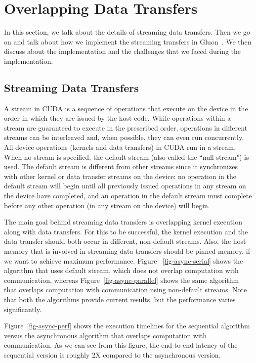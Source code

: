 \section{Overlapping Data Transfers}
\label{sec-async}

In this section, we talk about the details of streaming data transfers. Then we go on and talk about how we implement the streaming transfers in Gluon~\cite{dathathri2018gluon}. We then discuss about the implementation and the challenges that we faced during the implementation. 

\subsection{Streaming Data Transfers}

A stream in CUDA is a sequence of operations that execute on the device in the order in which they are issued by the host code. While operations within a stream are guaranteed to execute in the prescribed order, operations in different streams can be interleaved and, when possible, they can even run concurrently. All device operations (kernels and data transfers) in CUDA run in a stream. When no stream is specified, the default stream (also called the ``null stream") is used. The default stream is different from other streams since it synchronizes with 
other kernel or data transfer streams on the device: no operation in the default stream will begin until all previously issued operations in any stream on the device have completed, and an operation in the default stream must complete before any other operation (in any stream on the device) will begin.



The main goal behind streaming data transfers is 
overlapping kernel execution along with data transfers. 
For this to be successful, the kernel execution and the data transfer should both occur in different, non-default streams. Also, the host memory that is involved in streaming data transfers should be pinned memory, if we want to achieve maximum performance. Figure ~\ref{fig-async-serial} shows the algorithm that uses default stream, which does not overlap computation with communication, whereas Figure~\ref{fig-async-parallel} shows the same algorithm that overlaps computation with communication using non-default streams. Note that both the algorithms provide current results, but the performance varies significantly. 


Figure~\ref{fig-async-perf} shows the execution timelines for the sequential algorithm versus the asynchronous algorithm that overlaps computation with communication. As we can see from this figure, the end-to-end latency of the sequential version is roughly 2X compared to the asynchronous version. 

